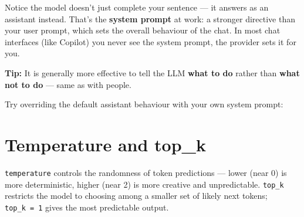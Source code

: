 \documentclass[
  letterpaper,
  DIV=11,
  numbers=noendperiod]{scrreprt}
\newenvironment{Shaded}{\begin{snugshade}}{\end{snugshade}}
\newcommand{\AttributeTok}[1]{\textcolor[rgb]{0.40,0.45,0.13}{#1}}
\newcommand{\DecValTok}[1]{\textcolor[rgb]{0.68,0.00,0.00}{#1}}
\newcommand{\FunctionTok}[1]{\textcolor[rgb]{0.28,0.35,0.67}{#1}}
\newcommand{\NormalTok}[1]{\textcolor[rgb]{0.00,0.23,0.31}{#1}}
\newcommand{\OtherTok}[1]{\textcolor[rgb]{0.00,0.23,0.31}{#1}}
\newcommand{\SpecialCharTok}[1]{\textcolor[rgb]{0.37,0.37,0.37}{#1}}
\newcommand{\StringTok}[1]{\textcolor[rgb]{0.13,0.47,0.30}{#1}}
\begin{document}
Notice the model doesn't just complete your sentence --- it answers as
an assistant instead. That's the \textbf{system prompt} at work: a
stronger directive than your user prompt, which sets the overall
behaviour of the chat. In most chat interfaces (like Copilot) you never
see the system prompt, the provider sets it for you.

\textbf{Tip:} It is generally more effective to tell the LLM
\textbf{what to do} rather than \textbf{what not to do} --- same as with
people.

Try overriding the default assistant behaviour with your own system
prompt:

\begin{Shaded}
\end{Shaded}

\section{Temperature and top\_k}\label{temperature-and-top_k}

\texttt{temperature} controls the randomness of token predictions ---
lower (near 0) is more deterministic, higher (near 2) is more creative
and unpredictable. \texttt{top\_k} restricts the model to choosing among
a smaller set of likely next tokens; \texttt{top\_k\ =\ 1} gives the
most predictable output.

\begin{Shaded}
\end{Shaded}
\end{document}
